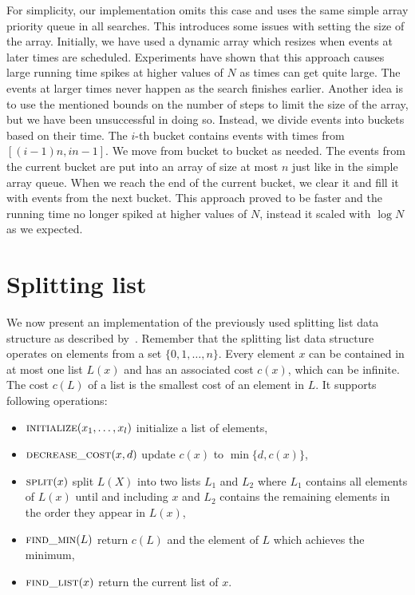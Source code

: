 For simplicity, our implementation omits this case and uses the same simple array priority queue in all searches. This introduces some issues with setting the size of the array. Initially, we have used a dynamic array which resizes when events at later times are scheduled. Experiments have shown that this approach causes large running time spikes at higher values of $N$ as times can get quite large. The events at larger times never happen as the search finishes earlier. Another idea is to use the mentioned bounds on the number of steps to limit the size of the array, but we have been unsuccessful in doing so. Instead, we divide events into buckets based on their time. The $i$-th bucket contains events with times from $[(i-1)n, in-1]$. We move from bucket to bucket as needed. The events from the current bucket are put into an array of size at most $n$ just like in the simple array queue. When we reach the end of the current bucket, we clear it and fill it with events from the next bucket. This approach proved to be faster and the running time no longer spiked at higher values of $N$, instead it scaled with $\log N$ as we expected.

\section{Splitting list}

We now present an implementation of the previously used splitting list data structure as described by~\cite{gabow1985scaling}. Remember that the splitting list data structure operates on elements from a set $\{0, 1, \dots, n\}$. Every element $x$ can be contained in at most one list $L(x)$ and has an associated cost $c(x)$, which can be infinite. The cost $c(L)$ of a list is the smallest cost of an element in $L$. It supports following operations:

\begin{itemize}
    \item $\textsc{initialize}(x_1, \dots, x_l)$ initialize a list of elements,
    \item $\textsc{decrease\_cost}(x, d)$ update $c(x)$ to $\min\{d, c(x)\}$,
    \item $\textsc{split}(x)$ split $L(X)$ into two lists $L_1$ and $L_2$ where $L_1$ contains all elements of $L(x)$ until and including $x$ and $L_2$ contains the remaining elements in the order they appear in $L(x)$,
    \item $\textsc{find\_min}(L)$ return $c(L)$ and the element of $L$ which achieves the minimum,
    \item $\textsc{find\_list}(x)$ return the current list of $x$.
\end{itemize}

